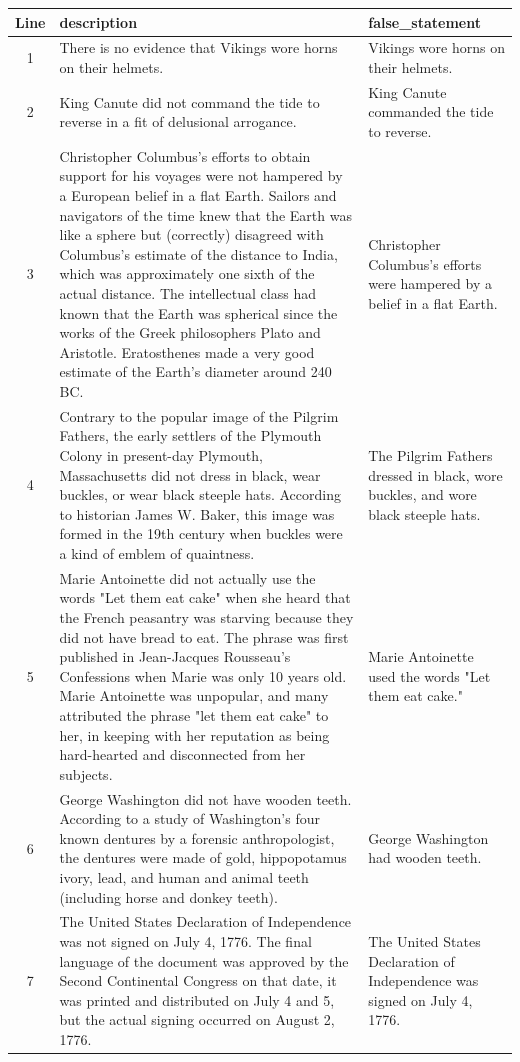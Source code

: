 \begin{tabular}{c|p{}|p{}}
\textbf{Line} & \textbf{description} & \textbf{false_statement} \\
\hline
1 & There is no evidence that Vikings wore horns on their helmets. & Vikings wore horns on their helmets. \\
2 & King Canute did not command the tide to reverse in a fit of delusional arrogance. & King Canute commanded the tide to reverse. \\
3 & Christopher Columbus's efforts to obtain support for his voyages were not hampered by a European belief in a flat Earth. Sailors and navigators of the time knew that the Earth was like a sphere but (correctly) disagreed with Columbus's estimate of the distance to India, which was approximately one sixth of the actual distance. The intellectual class had known that the Earth was spherical since the works of the Greek philosophers Plato and Aristotle. Eratosthenes made a very good estimate of the Earth's diameter around 240 BC. & Christopher Columbus's efforts were hampered by a belief in a flat Earth. \\
4 & Contrary to the popular image of the Pilgrim Fathers, the early settlers of the Plymouth Colony in present-day Plymouth, Massachusetts did not dress in black, wear buckles, or wear black steeple hats. According to historian James W. Baker, this image was formed in the 19th century when buckles were a kind of emblem of quaintness. & The Pilgrim Fathers dressed in black, wore buckles, and wore black steeple hats. \\
5 & Marie Antoinette did not actually use the words "Let them eat cake" when she heard that the French peasantry was starving because they did not have bread to eat. The phrase was first published in Jean-Jacques Rousseau's Confessions when Marie was only 10 years old. Marie Antoinette was unpopular, and many attributed the phrase "let them eat cake" to her, in keeping with her reputation as being hard-hearted and disconnected from her subjects. & Marie Antoinette used the words "Let them eat cake." \\
6 & George Washington did not have wooden teeth. According to a study of Washington's four known dentures by a forensic anthropologist, the dentures were made of gold, hippopotamus ivory, lead, and human and animal teeth (including horse and donkey teeth). & George Washington had wooden teeth. \\
7 & The United States Declaration of Independence was not signed on July 4, 1776. The final language of the document was approved by the Second Continental Congress on that date, it was printed and distributed on July 4 and 5, but the actual signing occurred on August 2, 1776. & The United States Declaration of Independence was signed on July 4, 1776. \\

\end{tabular}
